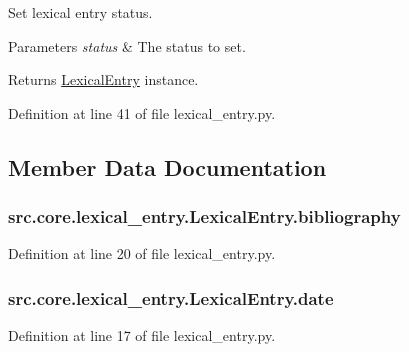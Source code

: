 Set lexical entry status. 


\begin{DoxyParams}{Parameters}
{\em status} & The status to set. \\
\hline
\end{DoxyParams}
\begin{DoxyReturn}{Returns}
\hyperlink{classsrc_1_1core_1_1lexical__entry_1_1_lexical_entry}{Lexical\+Entry} instance. 
\end{DoxyReturn}


Definition at line 41 of file lexical\+\_\+entry.\+py.



\subsection{Member Data Documentation}
\hypertarget{classsrc_1_1core_1_1lexical__entry_1_1_lexical_entry_a9f128ce8e68efcbab65b4163a56ab0dd}{
\subsubsection[{bibliography}]{\setlength{\rightskip}{0pt plus 5cm}src.\+core.\+lexical\+\_\+entry.\+Lexical\+Entry.\+bibliography}}\label{classsrc_1_1core_1_1lexical__entry_1_1_lexical_entry_a9f128ce8e68efcbab65b4163a56ab0dd}


Definition at line 20 of file lexical\+\_\+entry.\+py.

\hypertarget{classsrc_1_1core_1_1lexical__entry_1_1_lexical_entry_aaa4dae2afec96335786b54c8d5b5f12e}{
\subsubsection[{date}]{\setlength{\rightskip}{0pt plus 5cm}src.\+core.\+lexical\+\_\+entry.\+Lexical\+Entry.\+date}}\label{classsrc_1_1core_1_1lexical__entry_1_1_lexical_entry_aaa4dae2afec96335786b54c8d5b5f12e}


Definition at line 17 of file lexical\+\_\+entry.\+py.

